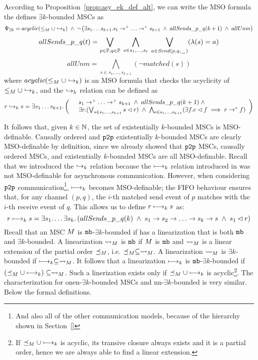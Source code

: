 \noindent According to Proposition~\ref{prop:asy_ek_def_alt}, we can write the MSO formula the defines $\exists k$-bounded MSCs as
\[
\Psi_{\exists k}=
acyclic(\le_\msc \cup \relbAsy) \;\wedge\;
\neg \left(
	\exists s_1 \dots s_{k+1}. s_1 \procrel^+ \dots \procrel^+ s_{k+1} \;\wedge \;
	allSends\_p\_q(k+1) \;\wedge\; allUnm
\right)
\]
\[
allSends\_p\_q (t) =
\bigvee_{\substack{p \in \mathbb{P}, q \in \mathbb{P}}}\;
\bigwedge_{s \in {s_1, ..., s_{t}}}\;
\bigvee_{a \in {\mathit{Send}(p,q,\hspace{0.1em}\underline{\hspace{0.5em}}\hspace{0.1em})}}
(\lambda(s) = a)
\]
\[
allUnm = \bigwedge_{s \in {s_1, ..., s_{k+1}}}(\neg \mathit{matched}(s))
\]
where $acyclic(\le_M \cup \hookrightarrow_{k})$ is an MSO formula that checks the acyclicity of $\le_M \cup \hookrightarrow_{k}$, and the $\hookrightarrow_{k}$ relation can be defined as
\[
r \relbAsy s= \exists s_1 \dots s_{k+1}. \left(
\begin{array}{rl}
	& s_1 \procrel^+ \dots \procrel^+ s_{k+1} \;\wedge\;
	allSends\_p\_q(k+1) \;\wedge\; \\
	& \exists r. (\bigvee_{s \in {s_1, ..., s_{k+1}}}s \lhd r) \;\wedge\;
	\bigwedge_{e \in {s_1, ..., s_{k+1}}}(\exists f.e \lhd f \implies r \procrel^* f) \\
\end{array}
\right)
\]

\medskip

It follows that, given $k \in \mathbb{N}$, the set of existentially $k$-bounded MSCs is MSO-definable. Causally ordered and $\mathtt{p2p}$ existentially $k$-bounded MSCs are clearly MSO-definable by definition, since we already showed that $\mathtt{p2p}$ MSCs, causally ordered MSCs, and existentially $k$-bounded MSCs are all MSO-definable. Recall that we introduced the $\hookrightarrow_{k}$ relation because the $\longmapsto_k$ relation introduced in \cite{DBLP:conf/fossacs/LohreyM02} was not MSO-definable for asynchronous communication. However, when considering $\mathtt{p2p}$ communication\footnote{And also all of the other communication models, because of the hierarchy shown in Section~\ref{}}, $\longmapsto_k$ becomes MSO-definable; the FIFO behaviour ensures that, for any channel $(p,q)$, the $i$-th matched send event of $p$ matches with the $i$-th receive event of $q$. This allows us to define $r \longmapsto_k s$ as:
\[
r \relb s=\exists s_1. \dots \exists s_k.\left(
allSends\_p\_q(k)
\;\wedge\; s_1\procrel s_2\procrel\dots
\procrel s_k\procrel s
\;\wedge\; s_1 \lhd r
\right)
\]
Recall that an MSC $M$ is $\mathtt{mb}$-$\exists k$-bounded if has a linearization that is both $\mathtt{mb}$ and $\exists k$-bounded. A linearization $\rightsquigarrow_M$ is $\mathtt{mb}$ if $M$ is $\mathtt{mb}$ and $\rightsquigarrow_M$ is a linear extension of the partial order $\preceq_M$, i.e. $\preceq_M \subseteq \rightsquigarrow_M$. A linearization $\rightsquigarrow_M$ is $\exists k$-bounded if $\longmapsto_k \subseteq \rightsquigarrow_M$. It follows that a linearization $\longmapsto_k$ is $\mathtt{mb}$-$\exists k$-bounded if $(\preceq_M \cup \longmapsto_k) \subseteq \rightsquigarrow_M$. Such a linerization exists only if $\preceq_M \cup \longmapsto_k$ is acyclic\footnote{If $\preceq_M \cup \longmapsto_k$ is acyclic, its transive closure always exists and it is a partial order, hence we are always able to find a linear extension.}. The characterization for onen-$\exists k$-bounded MSCs and nn-$\exists k$-bounded is very similar. Below the formal definitions.

